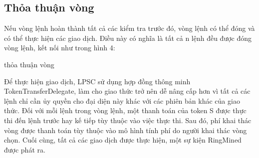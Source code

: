 \documentclass[12pt,a4paper]{article}
\makeatletter
\newenvironment{figurehere}
 {\def\@captype{figure}}
 {}
\makeatother
\begin{document}
\begin{multicols}{2}
\subsection{Thỏa thuận vòng\label{sec:settlement}}
Nếu vòng lệnh hoàn thành tất cả các kiểm tra trước đó, vòng lệnh có thể đóng và có thể thực hiện các giao dịch. Điều này có nghĩa là tất cả n lệnh đều được đóng vòng lệnh, kết nối như trong hình 4:
\begin{center}
\begin{figurehere}
\centering
{}
\caption{thỏa thuận vòng}
\label{fig:settlement}
\end{figurehere}
\end{center}
Để thực hiện giao dịch, LPSC sử dụng hợp đồng thông minh TokenTransferDelegate, làm cho giao thức trở nên dễ nâng cấp hơn vì tất cả các lệnh chỉ cần ủy quyền cho đại diện này khác với các phiên bản khác của giao thức.
Đối với mỗi lệnh trong vòng lệnh, một thanh toán của token S được thực thi đến lệnh trước hay kế tiếp tùy thuộc vào việc thực thi. Sau đó, phí khai thác vòng được thanh toán tùy thuộc vào mô hình tính phí do người khai thác vòng chọn. Cuối cùng, tất cả các giao dịch được thực hiện, một sự kiện RingMined được phát ra.


\end{multicols}
\end{document}
